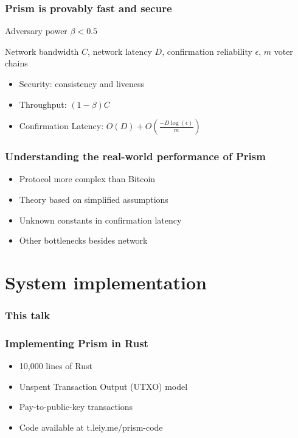 \documentclass[aspectratio=169]{beamer}
\begin{document}
\begin{frame}
    \frametitle{Prism is provably fast and secure}
    Adversary power $\beta < 0.5$

    Network bandwidth $C$, network latency $D$, confirmation reliability $\epsilon$, $m$ voter chains

    \begin{itemize}
        \item \alert{Security}: consistency and liveness
            \pause
        \item \alert{Throughput}: $(1-\beta)C$
            \pause
        \item \alert{Confirmation Latency}: $O\left(D\right) + O\left(\frac{-D\log\left(\epsilon\right)}{m}\right)$
    \end{itemize}
\end{frame}

\begin{frame}
    \frametitle{Understanding the real-world performance of Prism}
    \begin{itemize}
            \pause
        \item Protocol more complex than Bitcoin
            \pause
        \item Theory based on simplified assumptions 
            \pause
        \item Unknown constants in confirmation latency
            \pause
        \item Other bottlenecks besides network
    \end{itemize}
\end{frame}

\section{System implementation}

\begin{frame}
    \frametitle{This talk}
\end{frame}

\begin{frame}
    \frametitle{Implementing Prism in Rust}
    \begin{itemize}
        \item 10,000 lines of Rust
        \item Unspent Transaction Output (UTXO) model
        \item Pay-to-public-key transactions
        \item Code available at t.leiy.me/prism-code
    \end{itemize}
\end{frame}
\end{document}
